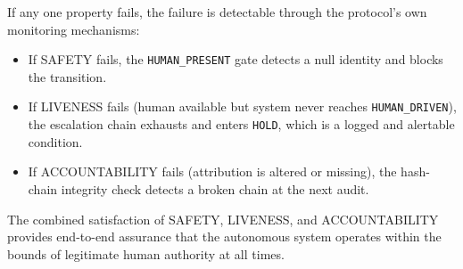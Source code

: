 If any one property fails, the failure is detectable through the protocol's own monitoring mechanisms:
\begin{itemize}
    \item If SAFETY fails, the \texttt{HUMAN\_PRESENT} gate detects a null identity and blocks the transition.
    \item If LIVENESS fails (human available but system never reaches \texttt{HUMAN\_DRIVEN}), the escalation chain exhausts and enters \texttt{HOLD}, which is a logged and alertable condition.
    \item If ACCOUNTABILITY fails (attribution is altered or missing), the hash-chain integrity check detects a broken chain at the next audit.
\end{itemize}

The combined satisfaction of SAFETY, LIVENESS, and ACCOUNTABILITY provides end-to-end assurance that the autonomous system operates within the bounds of legitimate human authority at all times.

\vfill %

